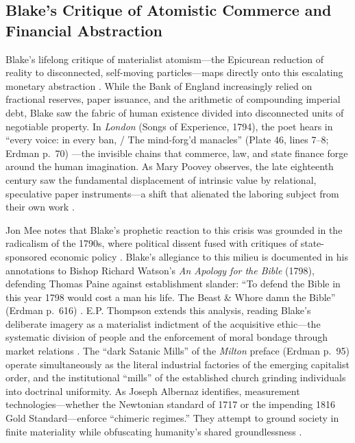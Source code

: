 \documentclass[
]{article}
\begin{document}
\subsection{Blake's Critique of Atomistic Commerce and Financial
Abstraction}\label{blakes-critique-of-atomistic-commerce-and-financial-abstraction}

Blake's lifelong critique of materialist atomism---the Epicurean
reduction of reality to disconnected, self-moving particles---maps
directly onto this escalating monetary abstraction
\citep{schouten2021lucretius}. While the Bank of England increasingly
relied on fractional reserves, paper issuance, and the arithmetic of
compounding imperial debt, Blake saw the fabric of human existence
divided into disconnected units of negotiable property. In \emph{London}
(Songs of Experience, 1794), the poet hears in ``every voice: in every
ban, / The mind-forg'd manacles'' (Plate 46, lines 7--8; Erdman p.~70)
\citep{erdman1988complete}---the invisible chains that commerce, law,
and state finance forge around the human imagination. As Mary Poovey
observes, the late eighteenth century saw the fundamental displacement
of intrinsic value by relational, speculative paper instruments---a
shift that alienated the laboring subject from their own work
\citep{poovey2008genres}.

Jon Mee notes that Blake's prophetic reaction to this crisis was
grounded in the radicalism of the 1790s, where political dissent fused
with critiques of state-sponsored economic policy
\citep{mee1992dangerous}. Blake's allegiance to this milieu is
documented in his annotations to Bishop Richard Watson's \emph{An
Apology for the Bible} (1798), defending Thomas Paine against
establishment slander: ``To defend the Bible in this year 1798 would
cost a man his life. The Beast \& Whore damn the Bible'' (Erdman p.~616)
\citep{erdman1988complete}. E.P. Thompson extends this analysis, reading
Blake's deliberate imagery as a materialist indictment of the
acquisitive ethic---the systematic division of people and the
enforcement of moral bondage through market relations
\citep{thompson1993witness}. The ``dark Satanic Mills'' of the
\emph{Milton} preface (Erdman p.~95) operate simultaneously as the
literal industrial factories of the emerging capitalist order, and the
institutional ``mills'' of the established church grinding individuals
into doctrinal uniformity. As Joseph Albernaz identifies, measurement
technologies---whether the Newtonian standard of 1717 or the impending
1816 Gold Standard---enforce ``chimeric regimes.'' They attempt to
ground society in finite materiality while obfuscating humanity's shared
groundlessness \citep{albernaz2024common}.
\end{document}
